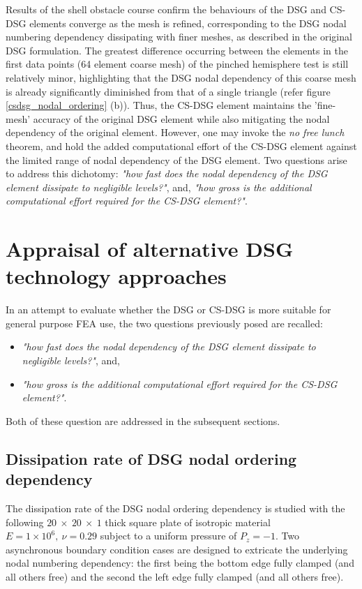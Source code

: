 Results of the shell obstacle course confirm the behaviours of the DSG and CS-DSG elements converge as the mesh is refined, corresponding to the DSG nodal numbering dependency dissipating with finer meshes, as described in the original DSG formulation. The greatest difference occurring between the elements in the first data points (64 element coarse mesh) of the pinched hemisphere test is still relatively minor, highlighting that the DSG nodal dependency of this coarse mesh is already significantly diminished from that of a single triangle (refer figure \ref{csdsg_nodal_ordering} (b)). Thus, the CS-DSG element maintains the 'fine-mesh' accuracy of the original DSG element while also mitigating the nodal dependency of the original element. However, one may invoke the \textit{no free lunch} theorem, and hold the added computational effort of the CS-DSG element against the limited range of nodal dependency of the DSG element. Two questions arise to address this dichotomy: \textit{"how fast does the nodal dependency of the DSG element dissipate to negligible levels?"}, and, 
 \textit{"how gross is the additional computational effort required for the CS-DSG element?"}. 
 
\section{Appraisal of alternative DSG technology approaches}
\label{CSDSG appraisal}
In an attempt to evaluate whether the DSG or CS-DSG is more suitable for general purpose FEA use, the two questions previously posed are recalled:

\begin{itemize}
	\item \textit{"how fast does the nodal dependency of the DSG element dissipate to negligible levels?"}, and,
	\item \textit{"how gross is the additional computational effort required for the CS-DSG element?"}.
\end{itemize}

Both of these question are addressed in the subsequent sections.

\subsection{Dissipation rate of DSG nodal ordering dependency}
The dissipation rate of the DSG nodal ordering dependency is studied with the following $20\ \times\ 20\ \times\ 1$ thick square plate of isotropic material $E = 1\times10^6,\ \nu = 0.29$ subject to a uniform pressure of $P_z = -1$. Two asynchronous boundary condition cases are designed to extricate the underlying nodal numbering dependency: the first being the bottom edge fully clamped (and all others free) and the second the left edge fully clamped (and all others free). 

